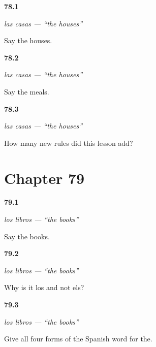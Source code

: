 \noindent\begin{minipage}[t]{\linewidth}
\raggedright
\hypertarget{review-ES-C44-las-houses}{\textbf{78.1}} \emph{las casas — \textquotedblleft{}the houses\textquotedblright{}}\par
\small Say the houses.
\end{minipage}\par\medskip

\noindent\begin{minipage}[t]{\linewidth}
\raggedright
\hypertarget{review-ES-C44-las-meals}{\textbf{78.2}} \emph{las casas — \textquotedblleft{}the houses\textquotedblright{}}\par
\small Say the meals.
\end{minipage}\par\medskip

\noindent\begin{minipage}[t]{\linewidth}
\raggedright
\hypertarget{review-ES-C44-las-rule}{\textbf{78.3}} \emph{las casas — \textquotedblleft{}the houses\textquotedblright{}}\par
\small How many new rules did this lesson add?
\end{minipage}\par\medskip

\section*{Chapter 79}

\noindent\begin{minipage}[t]{\linewidth}
\raggedright
\hypertarget{review-ES-C44-los-books}{\textbf{79.1}} \emph{los libros — \textquotedblleft{}the books\textquotedblright{}}\par
\small Say the books.
\end{minipage}\par\medskip

\noindent\begin{minipage}[t]{\linewidth}
\raggedright
\hypertarget{review-ES-C44-los-why}{\textbf{79.2}} \emph{los libros — \textquotedblleft{}the books\textquotedblright{}}\par
\small Why is it los and not els?
\end{minipage}\par\medskip

\noindent\begin{minipage}[t]{\linewidth}
\raggedright
\hypertarget{review-ES-C44-los-four}{\textbf{79.3}} \emph{los libros — \textquotedblleft{}the books\textquotedblright{}}\par
\small Give all four forms of the Spanish word for the.
\end{minipage}\par\medskip


